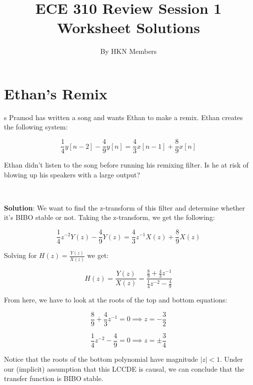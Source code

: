 \documentclass{article}
\title{ECE 310 Review Session 1 Worksheet Solutions}
\author{By HKN Members}
\date{}
\begin{document}
\maketitle

\section{Ethan's Remix}s
Pramod has written a song and wants Ethan to make a remix. Ethan creates the following system:

$$\frac{1}{4} y[n-2] - \frac{4}{9} y[n] = \frac{4}{3} x[n-1] + \frac{8}{9} x[n]$$

\noindent Ethan didn't listen to the song before running his remixing filter. Is he at risk of blowing up his speakers with a large output?

\

\noindent \textbf{Solution}: We want to find the z-transform of this filter and determine whether it's BIBO stable or not. Taking the z-transform, we get the following:

$$\frac{1}{4}z^{-2}Y(z) - \frac{4}{9}Y(z) = \frac{4}{3}z^{-1}X(z) + \frac{8}{9}X(z)$$

\noindent Solving for $H(z) = \frac{Y(z)}{X(z)}$ we get:

$$H(z) = \frac{Y(z)}{X(z)} = \frac{\frac{8}{9} + \frac{4}{3}z^{-1}}{\frac{1}{4}z^{-2} - \frac{4}{9}}$$

\noindent From here, we have to look at the roots of the top and bottom equations:

$$\frac{8}{9} + \frac{4}{3}z^{-1} = 0 \implies z = -\frac{3}{2}$$

$$\frac{1}{4}z^{-2} - \frac{4}{9} = 0 \implies z = \pm \frac{3}{4}$$

\noindent Notice that the roots of the bottom polynomial have magnitude $|z| < 1$. Under our (implicit) assumption that this LCCDE is causal, we can conclude that the transfer function is BIBO stable.

\newpage
\end{document}
